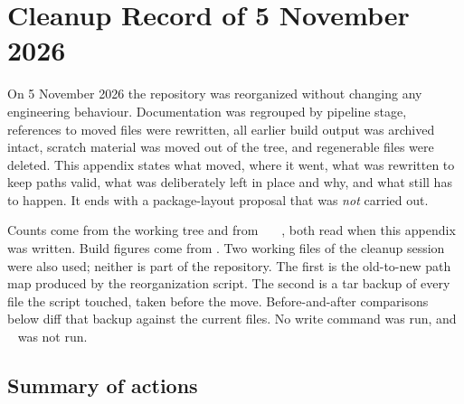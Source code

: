 \chapter{Cleanup Record of 5 November 2026}\label{app:cleanup}

On 5 November 2026 the repository was reorganized without changing any engineering behaviour. Documentation was regrouped by pipeline stage, references to moved files were rewritten, all earlier build output was archived intact, scratch material was moved out of the tree, and regenerable files were deleted. This appendix states what moved, where it went, what was rewritten to keep paths valid, what was deliberately left in place and why, and what still has to happen. It ends with a package-layout proposal that was \emph{not} carried out.

Counts come from the working tree and from ~~~, both read when this appendix was written. Build figures come from . Two working files of the cleanup session were also used; neither is part of the repository. The first is the old-to-new path map produced by the reorganization script. The second is a tar backup of every file the script touched, taken before the move. Before-and-after comparisons below diff that backup against the current files. No  write command was run, and ~ was not run.

\section{Summary of actions}\label{sec:cl-summary}

